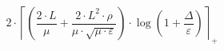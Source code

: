 \[2 \cdot \left\lceil \left(\frac{2 \cdot L}{\mu} + \frac{2 \cdot L^{2} \cdot \rho}{\mu \cdot \sqrt{\mu \cdot \varepsilon}}\right) \cdot \log\left(1 + \frac{\Delta}{\varepsilon}\right) \right\rceil_{+}\]

